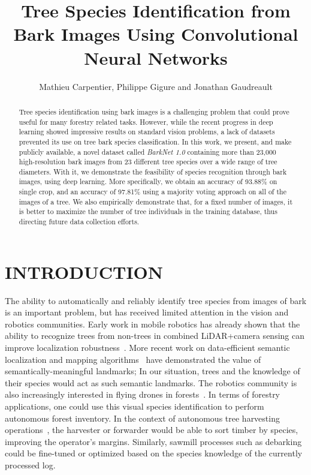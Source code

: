 \documentclass[letterpaper, 10 pt, conference]{ieeeconf}  %
\title{\LARGE \bf
Tree Species Identification from Bark Images Using Convolutional Neural Networks
}
\author{Mathieu Carpentier, Philippe Gigure and Jonathan Gaudreault}%
\begin{document}
\maketitle
\thispagestyle{empty}
\pagestyle{empty}


\begin{abstract}
Tree species identification using bark images is a challenging problem that could prove useful for many forestry related tasks. However, while the recent progress in deep learning showed impressive results on standard vision problems, a lack of datasets prevented its use on tree bark species classification. In this work, we present, and make publicly available, a novel dataset called \emph{BarkNet 1.0} containing more than 23,000 high-resolution bark images from 23 different tree species over a wide range of tree diameters. With it, we demonstrate the feasibility of species recognition through bark images, using deep learning. More specifically, we obtain an accuracy of 93.88\% on single crop, and an accuracy of 97.81\% using a majority voting approach on all of the images of a tree. We also empirically demonstrate that, for a fixed number of images, it is better to maximize the number of tree individuals in the training database, thus directing future data collection efforts.


\end{abstract}


\section{INTRODUCTION}

The ability to automatically and reliably identify tree species from images of bark is an important problem, but has received limited attention in the vision and robotics communities. Early work in mobile robotics has already shown that the ability to recognize trees from non-trees in combined LiDAR+camera sensing can improve localization robustness~\cite{TreeLiDAR2007}. More recent work on data-efficient semantic localization and mapping algorithms~\cite{MatrixPermanent,Toudeshki2018} have demonstrated the value of semantically-meaningful landmarks; In our situation, trees and the knowledge of their species would act as such semantic landmarks. The robotics community is also increasingly interested in flying drones in forests~\cite{SmolyanskiyKSB17}. In terms of forestry applications, one could use this visual species identification to perform autonomous forest inventory. In the context of autonomous tree harvesting operations~\cite{IJFE12426}, the harvester or forwarder would be able to sort timber by species, improving the operator's margins. Similarly, sawmill processes such as debarking could be fine-tuned or optimized based on the species knowledge of the currently processed log.
\end{document}
